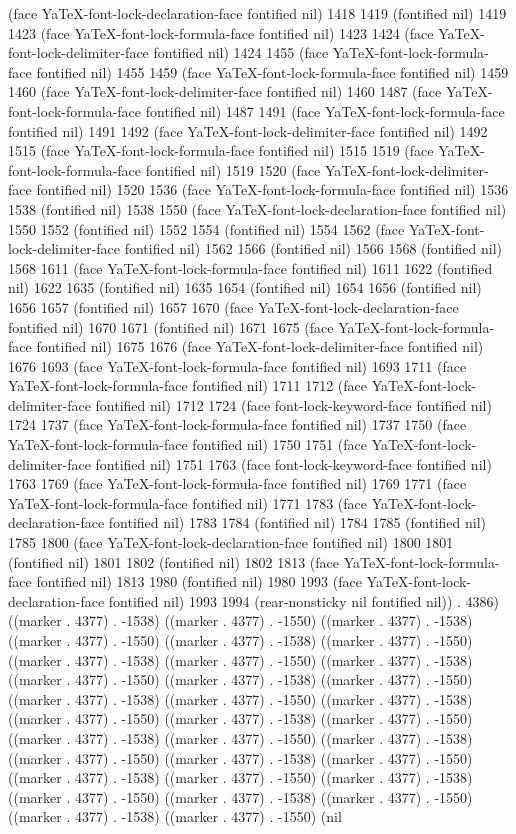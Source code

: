 (face YaTeX-font-lock-declaration-face fontified nil) 1418 1419 (fontified nil) 1419 1423 (face YaTeX-font-lock-formula-face fontified nil) 1423 1424 (face YaTeX-font-lock-delimiter-face fontified nil) 1424 1455 (face YaTeX-font-lock-formula-face fontified nil) 1455 1459 (face YaTeX-font-lock-formula-face fontified nil) 1459 1460 (face YaTeX-font-lock-delimiter-face fontified nil) 1460 1487 (face YaTeX-font-lock-formula-face fontified nil) 1487 1491 (face YaTeX-font-lock-formula-face fontified nil) 1491 1492 (face YaTeX-font-lock-delimiter-face fontified nil) 1492 1515 (face YaTeX-font-lock-formula-face fontified nil) 1515 1519 (face YaTeX-font-lock-formula-face fontified nil) 1519 1520 (face YaTeX-font-lock-delimiter-face fontified nil) 1520 1536 (face YaTeX-font-lock-formula-face fontified nil) 1536 1538 (fontified nil) 1538 1550 (face YaTeX-font-lock-declaration-face fontified nil) 1550 1552 (fontified nil) 1552 1554 (fontified nil) 1554 1562 (face YaTeX-font-lock-delimiter-face fontified nil) 1562 1566 (fontified nil) 1566 1568 (fontified nil) 1568 1611 (face YaTeX-font-lock-formula-face fontified nil) 1611 1622 (fontified nil) 1622 1635 (fontified nil) 1635 1654 (fontified nil) 1654 1656 (fontified nil) 1656 1657 (fontified nil) 1657 1670 (face YaTeX-font-lock-declaration-face fontified nil) 1670 1671 (fontified nil) 1671 1675 (face YaTeX-font-lock-formula-face fontified nil) 1675 1676 (face YaTeX-font-lock-delimiter-face fontified nil) 1676 1693 (face YaTeX-font-lock-formula-face fontified nil) 1693 1711 (face YaTeX-font-lock-formula-face fontified nil) 1711 1712 (face YaTeX-font-lock-delimiter-face fontified nil) 1712 1724 (face font-lock-keyword-face fontified nil) 1724 1737 (face YaTeX-font-lock-formula-face fontified nil) 1737 1750 (face YaTeX-font-lock-formula-face fontified nil) 1750 1751 (face YaTeX-font-lock-delimiter-face fontified nil) 1751 1763 (face font-lock-keyword-face fontified nil) 1763 1769 (face YaTeX-font-lock-formula-face fontified nil) 1769 1771 (face YaTeX-font-lock-formula-face fontified nil) 1771 1783 (face YaTeX-font-lock-declaration-face fontified nil) 1783 1784 (fontified nil) 1784 1785 (fontified nil) 1785 1800 (face YaTeX-font-lock-declaration-face fontified nil) 1800 1801 (fontified nil) 1801 1802 (fontified nil) 1802 1813 (face YaTeX-font-lock-formula-face fontified nil) 1813 1980 (fontified nil) 1980 1993 (face YaTeX-font-lock-declaration-face fontified nil) 1993 1994 (rear-nonsticky nil fontified nil)) . 4386) ((marker . 4377) . -1538) ((marker . 4377) . -1550) ((marker . 4377) . -1538) ((marker . 4377) . -1550) ((marker . 4377) . -1538) ((marker . 4377) . -1550) ((marker . 4377) . -1538) ((marker . 4377) . -1550) ((marker . 4377) . -1538) ((marker . 4377) . -1550) ((marker . 4377) . -1538) ((marker . 4377) . -1550) ((marker . 4377) . -1538) ((marker . 4377) . -1550) ((marker . 4377) . -1538) ((marker . 4377) . -1550) ((marker . 4377) . -1538) ((marker . 4377) . -1550) ((marker . 4377) . -1538) ((marker . 4377) . -1550) ((marker . 4377) . -1538) ((marker . 4377) . -1550) ((marker . 4377) . -1538) ((marker . 4377) . -1550) ((marker . 4377) . -1538) ((marker . 4377) . -1550) ((marker . 4377) . -1538) ((marker . 4377) . -1550) ((marker . 4377) . -1538) ((marker . 4377) . -1550) ((marker . 4377) . -1538) ((marker . 4377) . -1550) (nil 